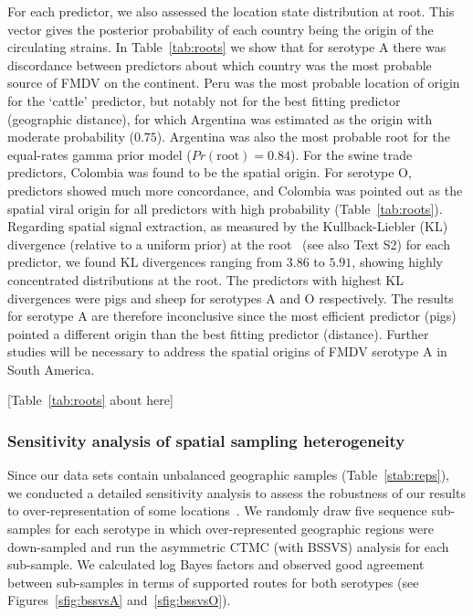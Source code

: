 \documentclass[10pt]{article}
\begin{document}
For each predictor, we also assessed the location state distribution at root. 
This vector gives the posterior probability of each country being the origin of the circulating strains.
In Table~\ref{tab:roots} we show that for serotype A there was discordance between predictors about which country was the most probable source of FMDV on the continent.
Peru was the most probable location of origin for the `cattle' predictor, but notably not for the best fitting predictor (geographic distance), for which Argentina was estimated as the origin with moderate probability ($0.75$).
Argentina was also the most probable root for the equal-rates gamma prior model ($Pr(\text{root})=0.84$).
For the swine trade predictors, Colombia was found to be the spatial origin.
For serotype O, predictors showed much more concordance, and Colombia was pointed out as the spatial viral origin for all predictors with high probability (Table~\ref{tab:roots}).
Regarding spatial signal extraction, as measured by the Kullback-Liebler (KL) divergence (relative  to a uniform prior) at the root~\cite{roots} (see also Text S2) for each predictor, we found KL divergences ranging from $3.86$ to $5.91$, showing highly concentrated distributions at the root. 
The predictors with highest KL divergences  were pigs and sheep for serotypes A and O respectively.
The results for serotype A are therefore inconclusive since the most efficient predictor (pigs) pointed a different origin than the best fitting predictor (distance).
Further studies will be necessary to address the spatial origins of FMDV serotype A in South America.

\begin{center}
 [Table~\ref{tab:roots} about here]
\end{center}
\subsubsection*{Sensitivity analysis of spatial sampling heterogeneity}

Since our data sets contain unbalanced geographic samples (Table~\ref{stab:reps}), we conducted a detailed sensitivity analysis to assess the robustness of our results to over-representation of some locations~\cite{Faria2012, fluPNAS, Bedford2010, polar}.
We randomly draw five sequence sub-samples for each serotype in which over-represented geographic regions were down-sampled and run the asymmetric CTMC (with BSSVS) analysis for each sub-sample.
We calculated log Bayes factors and observed good agreement between sub-samples in terms of supported routes for both serotypes (see Figures~\ref{sfig:bssvsA} and~\ref{sfig:bssvsO}). 
\end{document}
